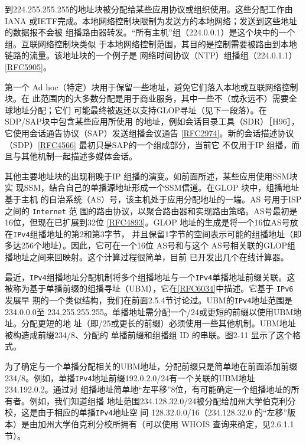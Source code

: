 到224.255.255.255的地址块被分配给某些应用协议或组织使用。这些分配工作由IANA
或IETF完成。本地网络控制块限制为发送方的本地网络；发送到这些地址的数据报不会被
组播路由器转发。“所有主机”组（224.0.0.1）是这个块中的一个组。互联网络控制块类似
于本地网络控制范围，其目的是控制需要被路由到本地链路的流量。该地址块的一个例子是
网络时间协议（NTP）组播组（224.0.1.1）\href{https://www.rfc-editor.org/rfc/rfc5905}{[RFC5905]}。

第一个 Ad hoc（特定）块用于保留一些地址，避免它们落入本地或互联网络控制块。在
此范围内的大多数分配是用于商业服务，其中一些不（或永远不）需要全球地址分配；它们
可能最终被返还以支持GLOP\footnotemark 寻址（见下一段落）。在SDP/SAP块中包含某些应用所使用
的地址，例如会话目录工具（SDR）［H96］，它使用会话通告协议（SAP）发送组播会议通告
\href{https://www.rfc-editor.org/rfc/rfc2974}{[RFC2974]}。新的会话描述协议（SDP）\href{https://www.rfc-editor.org/rfc/rfc4566}{[RFC4566]} 最初只是SAP的一个组成部分，当前它
不仅用于IP 组播，而且与其他机制一起描述多媒体会话。

其他主要地址块的出现稍晚于IP 组播的演变。如前面所述，某些应用使用SSM块实
现SSM，结合自己的单播源地址形成一个SSM信道。在GLOP 块中，组播地址基于主机
的自治系统（AS）号，该主机处于应用分配地址的一端。AS 号用于ISP 之间的 \verb|Internet| 范
围的路由协议，以聚合路由器和实现路由策略。AS号最初是16位，但现在已扩展到32位
\href{https://www.rfc-editor.org/rfc/rfc4893}{[RFC4893]}。GLOP 地址的生成是将一个16位AS号放在\verb|IPv4|组播地址的第2和第3字节，
并且保留1字节的空间表示可能的组播地址（即多达256个地址）。因此，它可在一个16位
AS号和与这个 AS号相关联的GLOP组播地址之间来回映射。这个计算过程很简单，目前
已开发出几个在线计算器。\footnotemark

最近，\verb|IPv4|组播地址分配机制将多个组播地址与一个\verb|IPv4|单播地址前缀关联。这
被称为基于单播前缀的组播寻址（UBM），它在\href{https://www.rfc-editor.org/rfc/rfc6034}{[RFC6034]}中描述。它基于 \verb|IPv6| 发展早
期的一个类似结构，我们在前面2.5.4节讨论过。UBM的\verb|IPv4|地址范围是234.0.0.0至
234.255.255.255。单播地址需分配一个/24或更短的前缀以使用UBM地址。分配更短的地
址（即/25或更长的前缀）必须使用一些其他机制。UBM地址被构造成前缀234/8、分配的
单播前缀和组播组 ID 的串联。图2-11 显示了这个格式。



为了确定与一个单播分配相关的UBM地址，分配前缀只是简单地在前面添加前缀
234/8。例如，单播\verb|IPv4|地址前缀192.0.2.0/24有一个关联的UBM地址234.192.0.2。通过对
组播地址简单地“左平移”8位，有可能确定一个组播地址的所有者。例如，我们知道组播
地址范围234.128.32.0/24被分配给加州大学伯克利分校，这是由于相应的单播\verb|IPv4|地址空
间 128.32.0.0/16（234.128.32.0 的“左移”版本）是由加州大学伯克利分校所拥有（可以使用
WHOIS 查询来确定，见2.6.1.1节）。

